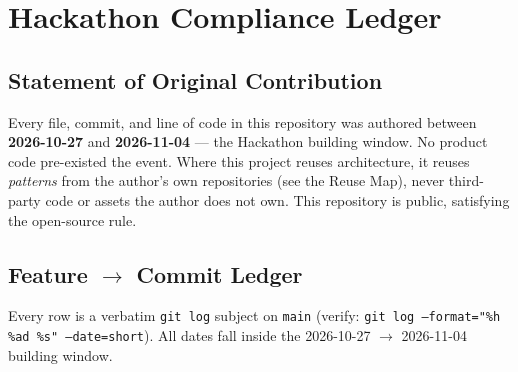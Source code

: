 \chapter{Hackathon Compliance Ledger}

\section{Statement of Original Contribution}
Every file, commit, and line of code in this repository was authored between
\textbf{2026-10-27} and \textbf{2026-11-04} --- the Hackathon building window. No product code
pre-existed the event. Where this project reuses architecture, it reuses \emph{patterns} from the
author's own repositories (see the Reuse Map), never third-party code or assets the author does not
own. This repository is public, satisfying the open-source rule.

\section{Feature $\rightarrow$ Commit Ledger}
Every row is a verbatim \texttt{git log} subject on \texttt{main} (verify:
\texttt{git log --format="\%h \%ad \%s" --date=short}). All dates fall inside the
2026-10-27 $\rightarrow$ 2026-11-04 building window.

